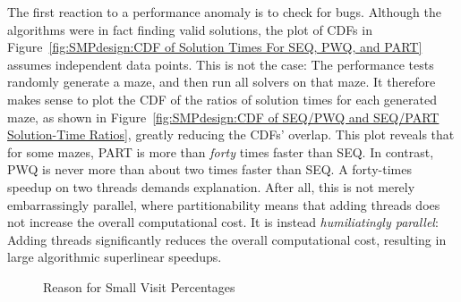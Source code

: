 The first reaction to a performance anomaly is to check for bugs.
Although the algorithms were in fact finding valid solutions, the
plot of CDFs in
Figure~\ref{fig:SMPdesign:CDF of Solution Times For SEQ, PWQ, and PART}
assumes independent data points.
This is not the case:  The performance tests randomly generate a maze,
and then run all solvers on that maze.
It therefore makes sense to plot the CDF of the ratios of
solution times for each generated maze,
as shown in
Figure~\ref{fig:SMPdesign:CDF of SEQ/PWQ and SEQ/PART Solution-Time Ratios},
greatly reducing the CDFs' overlap.
This plot reveals that for some mazes, PART
is more than \emph{forty} times faster than SEQ.
In contrast, PWQ is never more than about
two times faster than SEQ.
A forty-times speedup on two threads demands explanation.
After all, this is not merely embarrassingly parallel, where partitionability
means that adding threads does not increase the overall computational cost.
It is instead \emph{humiliatingly parallel}: Adding threads
significantly reduces the overall computational cost, resulting in
large algorithmic superlinear speedups.
\fi

\begin{figure}[tb]
\centering
{}
\caption{Reason for Small Visit Percentages}
\label{fig:SMPdesign:Reason for Small Visit Percentages}
\end{figure}

